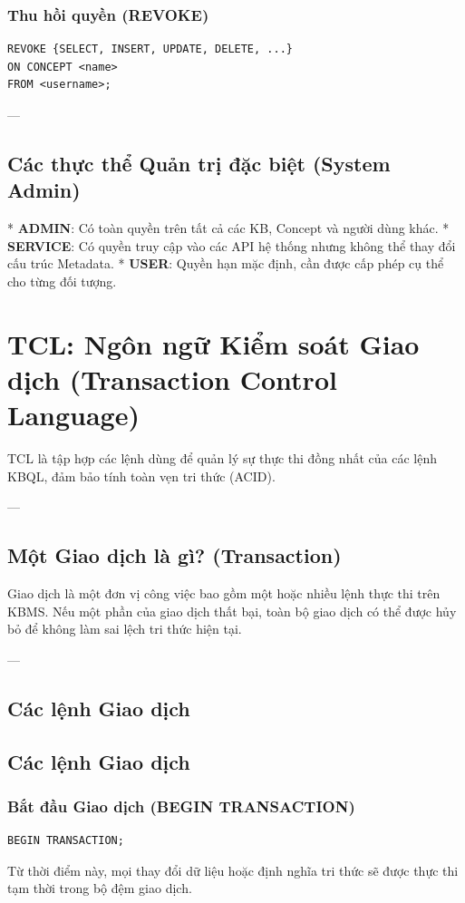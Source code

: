 \subsubsection{Thu hồi quyền (REVOKE)}
\begin{verbatim}
REVOKE {SELECT, INSERT, UPDATE, DELETE, ...} 
ON CONCEPT <name> 
FROM <username>;
\end{verbatim}

---

\subsection{Các thực thể Quản trị đặc biệt (System Admin)}

*   \textbf{ADMIN}: Có toàn quyền trên tất cả các KB, Concept và người dùng khác.
*   \textbf{SERVICE}: Có quyền truy cập vào các API hệ thống nhưng không thể thay đổi cấu trúc Metadata.
*   \textbf{USER}: Quyền hạn mặc định, cần được cấp phép cụ thể cho từng đối tượng.

\section{TCL: Ngôn ngữ Kiểm soát Giao dịch (Transaction Control Language)}

TCL là tập hợp các lệnh dùng để quản lý sự thực thi đồng nhất của các lệnh KBQL, đảm bảo tính toàn vẹn tri thức (ACID).

---

\subsection{Một Giao dịch là gì? (Transaction)}

Giao dịch là một đơn vị công việc bao gồm một hoặc nhiều lệnh thực thi trên KBMS. Nếu một phần của giao dịch thất bại, toàn bộ giao dịch có thể được hủy bỏ để không làm sai lệch tri thức hiện tại.

---

\subsection{Các lệnh Giao dịch}

\subsection{Các lệnh Giao dịch}

\subsubsection{Bắt đầu Giao dịch (BEGIN TRANSACTION)}
\begin{verbatim}
BEGIN TRANSACTION;
\end{verbatim}
Từ thời điểm này, mọi thay đổi dữ liệu hoặc định nghĩa tri thức sẽ được thực thi tạm thời trong bộ đệm giao dịch.

